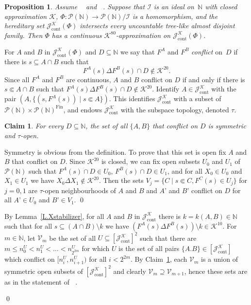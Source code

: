 \documentclass{amsart}
\makeatletter
\def\Fin{{\rm Fin}}   %
\def\text{\mbox}
\newtheorem{proposition}{Proposition}[section]
\newtheorem{claim}{Claim}
\theoremstyle{definition}
\theoremstyle{remark}
\def\Fin{\operatorname{Fin}}
\DeclareMathOperator{\Ccont}{cont}
\newcommand{\Jcont}{\cJ_{\Ccont}}
\newcommand{\cK}{{\mathcal K}}
\renewcommand{\proofname}{Proof}
\renewenvironment{proof}[1][\proofname]{\par
\let\oldqedsymbol\qedsymbol             %
  \normalfont
  \topsep6\p@\@plus6\p@ \trivlist
  \item[\hskip\labelsep\hskip\parindent\scshape
    #1\@addpunct{.}]\ignorespaces
}{%
  \qed\endtrivlist
\global\let\qedsymbol\oldqedsymbol      %
}
\newcommand{\cP}{\mathcal P}
\newcommand{\bbN}{\mathbb N}
\newcommand{\cI}{{\mathcal I}} %
\newcommand{\cJ}{{\mathcal J}} %
\newcommand{\cV}{\mathcal V}
\DeclareMathOperator{\OCAT}{OCA_T}
\DeclareMathOperator{\OCAsharp}{OCA^\#}
\DeclareMathOperator{\MAsigma}{MA(\sigma-\text{linked})}
\numberwithin{claim}{subsection}
\makeatother
\begin{document}
\begin{proposition} \label{P.uniformization} Assume $\OCAT$ and $\MAsigma$. Suppose that $\cI$ is an ideal on~$\bbN$ with closed  approximation $\cK$, $\Phi\colon \cP(\bbN)\to \cP(\bbN)/\cI$ is a homomorphism,
 and the hereditary set $\Jcont^\cK(\Phi)$ intersects every uncountable  tree-like almost disjoint family. 
		Then $\Phi$ has a continuous $\cK^{80}$-approximation  on  $\Jcont^\cK(\Phi)$. 
\end{proposition}



\begin{proof}
	For $A$ and $B$ in $\Jcont^\cK(\Phi)$ and $D\subseteq \bbN$ we say that $F^A$ and $F^B$ \emph{conflict} on~$D$ if there is $s\subseteq A\cap B$ such that 
	\[
	F^A(s)\Delta F^B(s)\cap D \notin \cK^{20}.
	\] 
	Since all $F^A$ and $F^B$ are continuous, $A$ and $B$ conflict on $D$ if and only if there is $s\Subset A\cap B$ such that $F^A(s)\Delta F^B(s)\cap D \notin \cK^{20}$.
	Identify $A\in \Jcont^\cK$ with the pair $(A,\{(s,F^A(s))\mid s\Subset A\})$. 
	This identifies $\Jcont^\cK$ with a subset of $\cP(\bbN)\times \cP(\bbN)^{\Fin}$, and endows  $\Jcont^{\cK}$ with the subspace topology, denoted  $\tau$. 
	
	\begin{claim} \label{C.conflict} For every $D\subseteq \bbN$, the set of all $\{A,B\}$ that conflict on $D$ is symmetric and  $\tau$-open. 
	\end{claim}
	
	\begin{proof}  Symmetry is obvious from the definition.  To prove that this set is open fix $A$ and $B$ that conflict on $D$.  Since $\cK^{20}$ is closed, we can fix open subsets $U_0$ and $U_1$ of $\cP(\bbN)$ such that $F^A(s)\cap D\in U_0$, $F^B(s)\cap D\in U_1$, and for all $X_0\in U_0$ and $X_1\in U_1$ we have $X_0\Delta X_1\notin \cK^{20}$.  Then the  sets $V_j=\{C\mid s\Subset C, F^C(s)\in U_j\}$  for $j=0,1$ are $\tau$-open neighbourhoods of $A$ and $B$ and $A’$ and $B’$ conflict on $D$ for all $A’\in U_0$ and $B’\in V_1$.
	\end{proof}
	
	By Lemma~\ref{L.Xstabilizer}, for all $A$ and $B$ in $\Jcont^\cK$ there is $k=k(A,B)\in \bbN$ such that for all $s\subseteq (A\cap B)\setminus k$ we have $(F^A(s)\Delta F^B(s))\setminus k\in \cK^{10}$. 
	For $m\in \bbN$, let $\cV_m$ be the set of all $U\subseteq [\Jcont^\cK]^2$ such that there are $m\leq n_0^U<n_1^U<\dots <n_{2^{2m}}^U$ for which $U$ is the set of all pairs $\{A.B\}\in [\Jcont^\cK]$ which conflict on $[n_i^U,n_{i+1}^U)$ for all $i<2^{2m}$. 
	By Claim~\ref{C.conflict}, each $\cV_m$ is a union of symmetric open subsets of $[\Jcont^\cK]^2$ and clearly $\cV_m\supseteq \cV_{m+1}$, hence these sets are as in the statement of $\OCAsharp$. 
	

\end{proof}
\end{document}

